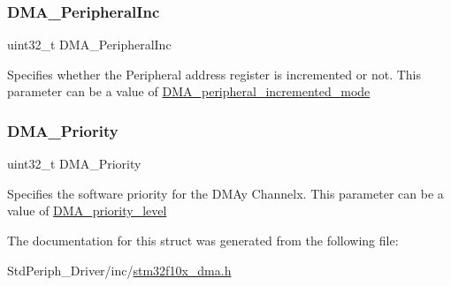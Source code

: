\subsubsection{\texorpdfstring{DMA\_PeripheralInc}{DMA\_PeripheralInc}}
{\footnotesize\ttfamily uint32\+\_\+t D\+M\+A\+\_\+\+Peripheral\+Inc}

Specifies whether the Peripheral address register is incremented or not. This parameter can be a value of \mbox{\hyperlink{group___d_m_a__peripheral__incremented__mode}{D\+M\+A\+\_\+peripheral\+\_\+incremented\+\_\+mode}} \mbox{\label{struct_d_m_a___init_type_def_aabb62e3f5536fc15a201058a1b6bda18}} 
\subsubsection{\texorpdfstring{DMA\_Priority}{DMA\_Priority}}
{\footnotesize\ttfamily uint32\+\_\+t D\+M\+A\+\_\+\+Priority}

Specifies the software priority for the D\+M\+Ay Channelx. This parameter can be a value of \mbox{\hyperlink{group___d_m_a__priority__level}{D\+M\+A\+\_\+priority\+\_\+level}} 

The documentation for this struct was generated from the following file\+:\begin{DoxyCompactItemize}
\item 
Std\+Periph\+\_\+\+Driver/inc/\mbox{\hyperlink{stm32f10x__dma_8h}{stm32f10x\+\_\+dma.\+h}}\end{DoxyCompactItemize}

